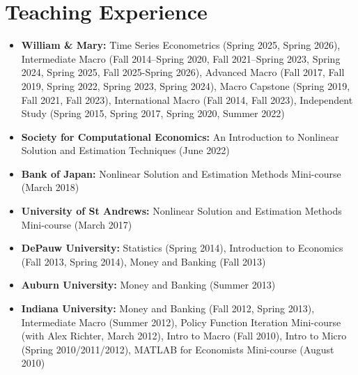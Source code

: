 \documentclass[10pt,letterpaper,en-US]{article}
\begin{document}

\section*{Teaching Experience}

\begin{itemize}

\item \textbf{William \& Mary:} Time Series Econometrics (Spring 2025, Spring 2026), Intermediate Macro (Fall 2014--Spring 2020, Fall 2021--Spring 2023, Spring 2024, Spring 2025, Fall 2025-Spring 2026), Advanced Macro (Fall 2017, Fall 2019, Spring 2022, Spring 2023, Spring 2024), Macro Capstone (Spring 2019, Fall 2021, Fall 2023), International Macro (Fall 2014, Fall 2023), Independent Study (Spring 2015, Spring 2017, Spring 2020, Summer 2022)
\item \textbf{Society for Computational Economics:} An Introduction to Nonlinear Solution and Estimation Techniques (June 2022)
\item \textbf{Bank of Japan:} Nonlinear Solution and Estimation Methods Mini-course (March 2018)
\item \textbf{University of St Andrews:} Nonlinear Solution and Estimation Methods Mini-course (March 2017)
\item \textbf{DePauw University:} Statistics (Spring 2014), Introduction to Economics (Fall 2013, Spring 2014), Money and Banking (Fall 2013)
\item \textbf{Auburn University:} Money and Banking (Summer 2013)
\item \textbf{Indiana University:} Money and Banking (Fall 2012, Spring 2013), Intermediate Macro (Summer 2012), Policy Function Iteration Mini-course (with Alex Richter, March 2012), Intro to Macro (Fall 2010), Intro to Micro (Spring 2010/2011/2012), MATLAB for Economists Mini-course (August 2010)
\end{itemize}
\newpage
\end{document}

